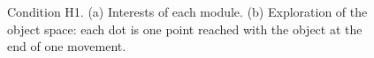 \documentclass[10pt,letterpaper]{article}
\begin{document}
	
		\begin{figure}[ht]
			\caption{Condition H1. (a) Interests of each module. (b) Exploration of the object space: each dot is one point reached with the object at the end of one movement.}
			\label{res_interests}
		\end{figure}
	
\end{document}
